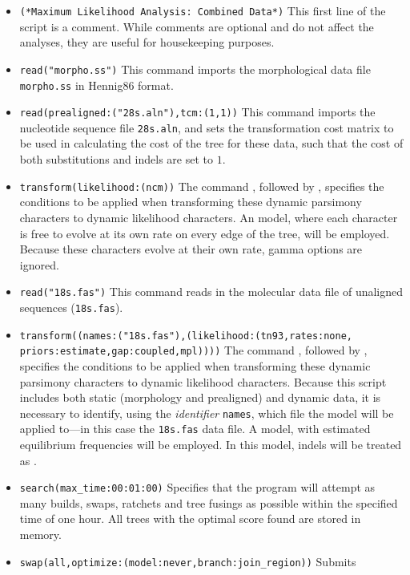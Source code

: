 \begin{itemize}
\item \texttt{(*Maximum Likelihood Analysis: Combined Data*)} 
This first line of the script is a comment. While comments are 
optional and do not affect the analyses, they are useful for housekeeping 
purposes.
\item \texttt{read("morpho.ss")} This command imports the morphological 
data file \texttt{morpho.ss} in Hennig86 format. 
\item \texttt{read(prealigned:("28s.aln"),tcm:(1,1))} This command imports 
the  nucleotide sequence file \texttt{28s.aln}, 
and sets the transformation cost matrix to be used in calculating
the cost of the tree for these data, such that the cost of both substitutions 
and indels are set to $1$. 
\item \texttt{transform(likelihood:(ncm))} The command , 
followed by , specifies the conditions to be 
applied when transforming these dynamic parsimony characters to 
dynamic likelihood characters. An  model, where 
each character is free to evolve at its own rate on every edge of the tree, 
will be employed.  Because these characters evolve at their own rate, 
gamma options are ignored.
\item \texttt{read("18s.fas")} This command reads in the molecular 
data file of unaligned sequences (\texttt{18s.fas}).
\item \texttt{transform((names:("18s.fas"),(likelihood:(tn93,rates:none,\\
priors:estimate,gap:coupled,mpl))))} The command , 
followed by , specifies the conditions to be 
applied when transforming these dynamic parsimony characters to 
dynamic likelihood characters. Because this script includes both static 
(morphology and prealigned) and dynamic data, it is necessary to 
identify, using the \emph{identifier} \texttt{names}, which file the 
 model will be applied to---in this case the 
\texttt{18s.fas} data file. A  model, with estimated
equilibrium frequencies will be employed.  In this model, indels will be 
treated as .
\item \texttt{search(max\_time:00:01:00)} Specifies that the program will 
attempt as many builds, swaps, ratchets and tree fusings as possible within 
the specified time of one hour. All trees with the optimal score found are 
stored in memory.
\item \texttt{swap(all,optimize:(model:never,branch:join\_region))} Submits 

\end{itemize}
